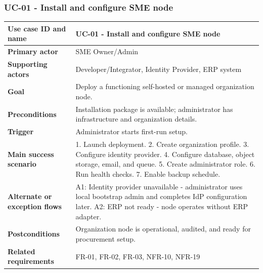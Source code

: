\documentclass[11pt,a4paper]{article}
\begin{document}
\subsubsection{UC-01 - Install and configure SME node}
\begin{footnotesize}
\begin{longtable}{@{}p{}p{}@{}}
\rowcolor{gray!10}\textbf{Use case ID and name} & UC-01 - Install and configure SME node \\ \hline
\rowcolor{gray!10}\textbf{Primary actor} & SME Owner/Admin \\ \hline
\rowcolor{gray!10}\textbf{Supporting actors} & Developer/Integrator, Identity Provider, ERP system \\ \hline
\rowcolor{gray!10}\textbf{Goal} & Deploy a functioning self-hosted or managed organization node. \\ \hline
\rowcolor{gray!10}\textbf{Preconditions} & Installation package is available; administrator has infrastructure and organization details. \\ \hline
\rowcolor{gray!10}\textbf{Trigger} & Administrator starts first-run setup. \\ \hline
\rowcolor{gray!10}\textbf{Main success scenario} & 1. Launch deployment. 2. Create organization profile. 3. Configure identity provider. 4. Configure database, object storage, email, and queue. 5. Create administrator role. 6. Run health checks. 7. Enable backup schedule. \\ \hline
\rowcolor{gray!10}\textbf{Alternate or exception flows} & A1: Identity provider unavailable - administrator uses local bootstrap admin and completes IdP configuration later. A2: ERP not ready - node operates without ERP adapter. \\ \hline
\rowcolor{gray!10}\textbf{Postconditions} & Organization node is operational, audited, and ready for procurement setup. \\ \hline
\rowcolor{gray!10}\textbf{Related requirements} & FR-01, FR-02, FR-03, NFR-10, NFR-19 \\ \hline
\end{longtable}
\end{footnotesize}
\end{document}
